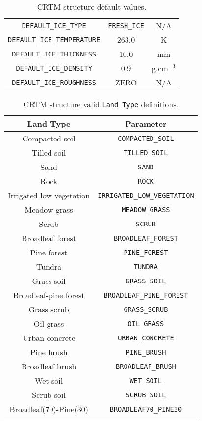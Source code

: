 \begin{table}[htp]
\begin{tabular}{|c|c|c|}
    \hline
    \texttt{DEFAULT\_ICE\_TYPE}               & \texttt{FRESH\_ICE} & N/A\\
    \texttt{DEFAULT\_ICE\_TEMPERATURE}        & 263.0      & K\\
    \texttt{DEFAULT\_ICE\_THICKNESS}          & 10.0       & mm\\
    \texttt{DEFAULT\_ICE\_DENSITY}            & 0.9        & g.cm$^{-3}$\\
    \texttt{DEFAULT\_ICE\_ROUGHNESS}          & ZERO       & N/A\\
    \hline
  \end{tabular}
  \caption{CRTM \Surface{} structure default values.}
  \label{tab:surface_default}
\end{table}

\begin{table}[htp]
  \centering
  \begin{tabular}{|c|c|}
    \hline
    \sffamily\textbf{Land Type} & \sffamily\textbf{Parameter} \\
    \hline\hline
          Compacted soil      & \texttt{COMPACTED\_SOIL} \\
            Tilled soil       & \texttt{TILLED\_SOIL} \\
              Sand            & \texttt{SAND} \\
              Rock            & \texttt{ROCK} \\
     Irrigated low vegetation & \texttt{IRRIGATED\_LOW\_VEGETATION} \\
           Meadow grass       & \texttt{MEADOW\_GRASS} \\
              Scrub           & \texttt{SCRUB} \\
         Broadleaf forest     & \texttt{BROADLEAF\_FOREST} \\
           Pine forest        & \texttt{PINE\_FOREST} \\
             Tundra           & \texttt{TUNDRA} \\
           Grass soil         & \texttt{GRASS\_SOIL} \\
       Broadleaf-pine forest  & \texttt{BROADLEAF\_PINE\_FOREST} \\
           Grass scrub        & \texttt{GRASS\_SCRUB} \\
            Oil grass         & \texttt{OIL\_GRASS} \\
          Urban concrete      & \texttt{URBAN\_CONCRETE} \\
            Pine brush        & \texttt{PINE\_BRUSH} \\
          Broadleaf brush     & \texttt{BROADLEAF\_BRUSH} \\
             Wet soil         & \texttt{WET\_SOIL} \\
            Scrub soil        & \texttt{SCRUB\_SOIL} \\
      Broadleaf(70)-Pine(30)  & \texttt{BROADLEAF70\_PINE30} \\
    \hline
  \end{tabular}
  \caption{CRTM \Surface{} structure valid \texttt{Land\_Type} definitions.}
  \label{tab:surface_land_type}
\end{table}

